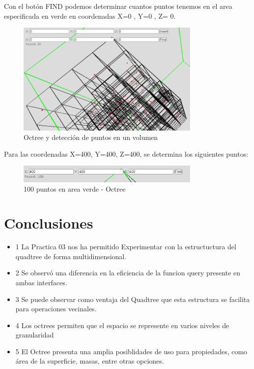 \documentclass{article}
\begin{document}
Con el botón FIND podemos determinar cuantos puntos tenemos en el area especificada en verde en coordenadas X=0 , Y=0 , Z= 0.

\begin{figure}[H]
\centering
\includegraphics[width=0.8\textwidth]{img/oct_100verde.png}
\caption{Octree y detección de puntos en un volumen}
\end{figure}

Para las coordenadas X=400, Y=400, Z=400, se determina los siguientes puntos:

\begin{figure}[H]
\centering
\includegraphics[width=0.8\textwidth]{img/oct_found100.png}
\caption{100 puntos en area verde - Octree}
\end{figure}

\section{Conclusiones}

\begin{itemize}
            \item 1 La Practica 03 nos ha permitido Experimentar con la estructuctura del quadtree de forma multidimensional.
\end{itemize}
\begin{itemize}
            \item 2 Se observó una diferencia en la eficiencia de la funcion query presente en ambas interfaces.
\end{itemize}

\begin{itemize}
            \item 3 Se puede observar como ventaja del Quadtree que esta estructura se facilita para operaciones vecinales.
\end{itemize}    
\begin{itemize}
            \item 4 Los octrees permiten que el espacio se represente en varios niveles de granularidad
\end{itemize}
\begin{itemize}
            \item 5 El Octree presenta una amplia posiblidades de uso para propiedades, como área de la superficie, masas, entre otras opciones.
\end{itemize}
	
	
	
\end{document}
